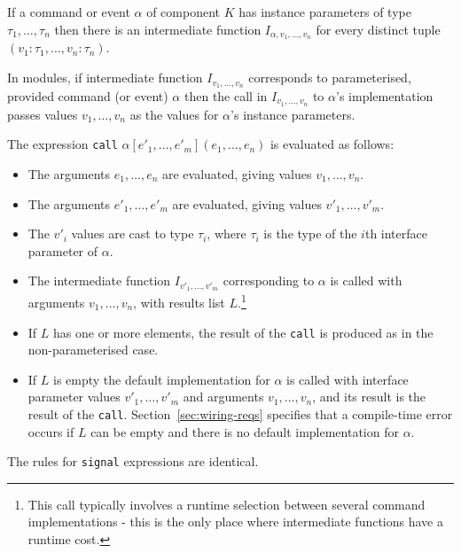 \documentclass[11pt,letterpaper]{article}
\newcommand{\code}[1]{{\tt #1}}
\begin{document}
If a command or event $\alpha$ of component $K$ has instance
parameters of type $\tau_1, \ldots, \tau_n$ then there is an
intermediate function $I_{\alpha,v_1,\ldots,v_n}$ for every distinct
tuple $(v_1:\tau_1, \ldots, v_n:\tau_n)$.

In modules, if intermediate function $I_{v_1, \ldots, v_n}$ corresponds
to parameterised, provided command (or event) $\alpha$ then the call in
$I_{v_1, \ldots, v_n}$ to $\alpha$'s implementation passes values $v_1,
\ldots, v_n$ as the values for $\alpha$'s instance parameters. 

The expression \code{call} $\alpha[e'_1, \ldots, e'_m](e_1, \ldots, e_n)$
is evaluated as follows:
\begin{itemize}
\item The arguments $e_1, \ldots, e_n$ are evaluated, giving values $v_1,
\ldots, v_n$.
\item The arguments $e'_1, \ldots, e'_m$ are evaluated, giving values $v'_1,
\ldots, v'_m$.
\item The $v'_i$ values are cast to type $\tau_i$, where $\tau_i$ is the
type of the $i$th interface parameter of $\alpha$.
\item The intermediate function $I_{v'_1,\ldots,v'_m}$ corresponding to
$\alpha$ is called with arguments $v_1, \ldots, v_n$, with results list
$L$.\footnote{This call typically involves a runtime selection between
several command implementations - this is the only place where intermediate
functions have a runtime cost.}
\item If $L$ has one or more elements, the result of the \code{call} is
produced as in the non-parameterised case.
\item If $L$ is empty the default implementation for $\alpha$ is called
with interface parameter values $v'_1, \ldots, v'_m$ and arguments $v_1,
\ldots, v_n$, and its result is the result of the
\code{call}. Section~\ref{sec:wiring-reqs} specifies that a compile-time
error occurs if $L$ can be empty and there is no default implementation for
$\alpha$.
\end{itemize}
The rules for \code{signal} expressions are identical.
\end{document}
